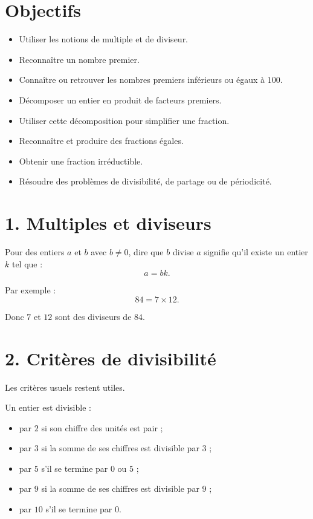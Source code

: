 
\section{Objectifs}

\begin{itemize}
\item Utiliser les notions de multiple et de diviseur.
\item Reconnaître un nombre premier.
\item Connaître ou retrouver les nombres premiers inférieurs ou égaux à $100$.
\item Décomposer un entier en produit de facteurs premiers.
\item Utiliser cette décomposition pour simplifier une fraction.
\item Reconnaître et produire des fractions égales.
\item Obtenir une fraction irréductible.
\item Résoudre des problèmes de divisibilité, de partage ou de périodicité.
\end{itemize}

\section{1. Multiples et diviseurs}

Pour des entiers $a$ et $b$ avec $b\neq0$, dire que $b$ divise $a$ signifie qu'il existe un entier $k$ tel que :
\[
a=bk.
\]

Par exemple :
\[
84=7\times12.
\]

Donc $7$ et $12$ sont des diviseurs de $84$.

\section{2. Critères de divisibilité}

Les critères usuels restent utiles.

Un entier est divisible :
\begin{itemize}
\item par $2$ si son chiffre des unités est pair ;
\item par $3$ si la somme de ses chiffres est divisible par $3$ ;
\item par $5$ s'il se termine par $0$ ou $5$ ;
\item par $9$ si la somme de ses chiffres est divisible par $9$ ;
\item par $10$ s'il se termine par $0$.
\end{itemize}

